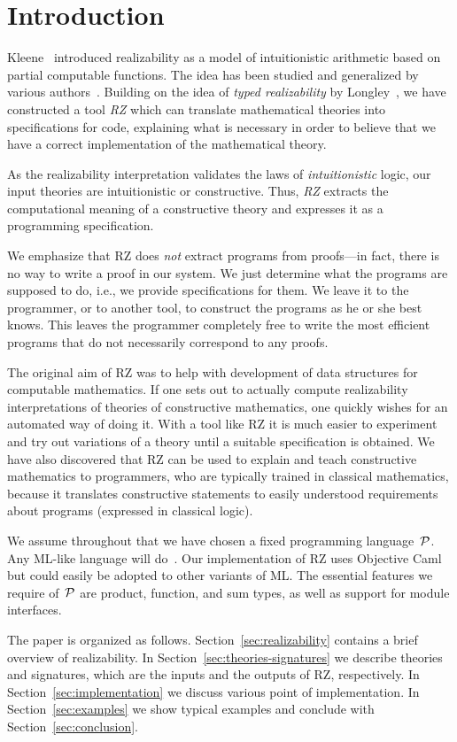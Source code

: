 \section{Introduction}
\label{sec:introduction}

Kleene~\cite{KleeneSC:intint} introduced realizability as a model of
intuitionistic arithmetic based on partial computable functions. The
idea has been studied and generalized by various
authors~\cite{TroelstraA:rea,HylandJ:efft,HylandJ:trit,OostenJ:exer}.
Building on the idea of \emph{typed realizability} by
Longley~\cite{Longley00}, we have constructed a tool \emph{RZ} which
can translate mathematical theories into specifications for code,
explaining what is necessary in order to believe that we have a correct
implementation of the mathematical theory.

As the realizability interpretation validates the laws of
\emph{intuitionistic} logic, our input theories are intuitionistic or
constructive. Thus, \emph{RZ} extracts the computational
meaning of a constructive theory and expresses it as a programming
specification.

We emphasize that RZ does \emph{not} extract programs from proofs---in
fact, there is no way to write a proof in our system. We just
determine what the programs are supposed to do, i.e., we provide
specifications for them. We leave it to the programmer, or to another
tool, to construct the programs as he or she best knows. This leaves
the programmer completely free to write the most efficient programs
that do not necessarily correspond to any proofs.

The original aim of RZ was to help with development of data structures
for computable mathematics. If one sets out to actually compute
realizability interpretations of theories of constructive mathematics,
one quickly wishes for an automated way of doing it. With a tool like
RZ it is much easier to experiment and try out variations of a theory
until a suitable specification is obtained. We have also discovered
that RZ can be used to explain and teach constructive mathematics to
programmers, who are typically trained in classical mathematics,
because it translates constructive statements to easily understood
requirements about programs (expressed in classical logic).

We assume throughout that we have chosen a fixed programming
language~$\mathcal{P}$. Any ML-like language will
do~\cite{milner+:definition}. Our implementation of RZ uses Objective
Caml~\cite{ocaml} but could easily be adopted to other variants of ML.
The essential features we require of~$\mathcal{P}$ are product, function, and
sum types, as well as support for module interfaces.

The paper is organized as follows. Section~\ref{sec:realizability}
contains a brief overview of realizability. In
Section~\ref{sec:theories-signatures} we describe theories and
signatures, which are the inputs and the outputs of RZ, respectively. In
Section~\ref{sec:implementation} we discuss various point of
implementation. In Section~\ref{sec:examples} we show typical examples
and conclude with Section~\ref{sec:conclusion}.


